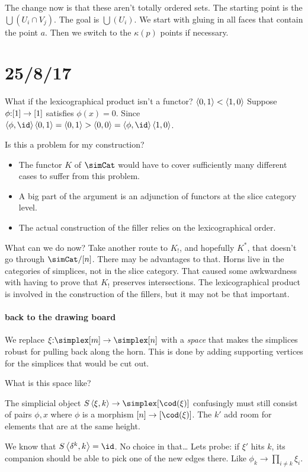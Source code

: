 \documentclass[csh.tex]{subfiles}
\begin{document}
The change now is that these aren't totally ordered sets. The starting point is the $\bigcup(U_i\cap V_j)$. The goal is $\bigcup(U_i)$. We start with gluing in all faces that contain the point $a$. Then we switch to the $\kappa(p)$ points if necessary.

\section{25/8/17}
What if the lexicographical product isn't a functor?
$\left\langle 0,1 \right\rangle < \left\langle 1,0 \right\rangle$
Suppose $\phi\mathord :[1]\to[1]$ satisfies $\phi(x)=0$.
Since $\tuplet{\phi,\id}\tuplet{0,1}=\tuplet{0,1}>\tuplet{0,0} = \tuplet{\phi,\id}\tuplet{1,0}$.

Is this a problem for my construction?
\begin{itemize}
\item The functor $K$ of $\simCat$ would have to cover sufficiently many different cases to suffer from this problem.
\item A big part of the argument is an adjunction of functors at the slice category level.
\item The actual construction of the filler relies on the lexicographical
order.
\end{itemize}

What can we do now?
Take another route to $K_!$, and hopefully $K^*$, that doesn't go through $\simCat/[n]$.
There may be advantages to that.
Horns live in the categories of simplices, not in the slice category. That caused some awkwardness with having to prove that $K_!$ preserves intersections.
The lexicographical product is involved in the construction of the fillers, but it may not be that important.

\paragraph{back to the drawing board}
We replace $\xi\of\simplex[m]\to\simplex[n]$ with a \emph{space} that makes the simplices robust for pulling back along the horn. This is done
by adding supporting vertices for the simplices that would be cut out.

What is this space like?

The simplicial object $S\tuplet{\xi,k}\to\simplex[\cod(\xi)]$ confusingly must still consist of
pairs ${\phi,x}$ where $\phi$ is a morphism $[n]\to[\cod(\xi)]$. The $k'$ add room for elements that are at the same height.

We know that $S\tuplet{\delta^k,k} = \id$. No choice in that\dots
Lets probe: if $\xi'$ hits $k$, its companion should be able to pick one of the new edges there. Like $\phi_k\to \prod_{i\neq k} \xi_i$.
\end{document}
